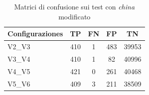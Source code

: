 \begin{table}[htbp]
	\centering
	\caption{Matrici di confusione sui test con \emph{china} modificato}
	\label{tab:china_mod_treshold}
	
	\begin{tabular}{lcccc}
		\toprule
		Configuraziones & TP & FN & FP & TN \\
		\midrule
		
		V2\_V3 & 410 & 1 & 483 & 39953 \\
		V3\_V4 & 410 & 1 & 82  & 40996 \\
		V4\_V5 & 421 & 0 & 261 & 40468 \\
		V5\_V6 & 409 & 3 & 211 & 38509 \\
		\bottomrule
	\end{tabular}
\end{table}
